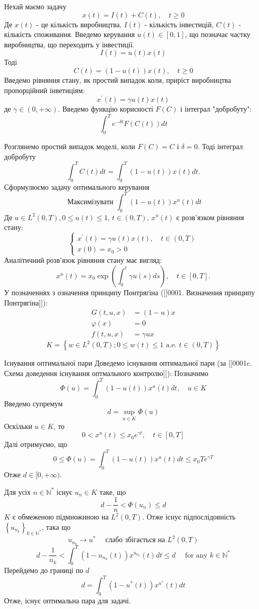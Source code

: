 \documentclass[a4paper,12pt]{extreport}
\begin{document}
Нехай маємо задачу
$$
x(t)=I(t)+C(t), \quad t \geq 0
$$
Де $x(t)$ - це кількість виробництва, $I(t)$ - кількість інвестицій, $C(t)$ - кількість споживання. 
Введемо керування $u(t) \in[0,1]$, що позначає частку виробництва, що переходить у інвестиції.
$$
I(t)=u(t) x(t)
$$
Тоді 
$$
C(t)=(1-u(t)) x(t), \quad t \geq 0
$$
Введемо рівняння стану, як простий випадок коли, приріст виробництва пропорційний інветиціям:
$$
x^{\prime}(t)=\gamma u(t) x(t)
$$
де $\gamma \in(0,+\infty)$.
Введемо функцію корисності $F(C)$ і інтеграл "добробуту":
$$
\int_0^T e^{-\delta t} F(C(t)) d t
$$

Розглянемо простий випадок моделі, коли $F(C)=C \text { і } \delta=0$.
Тоді інтеграл добробуту 
$$
\int_0^T C(t) d t=\int_0^T(1-u(t)) x(t) d t .
$$
Сформулюємо задачу оптимального керування
$$
\text { Максимізувати } \int_0^T(1-u(t)) x^u(t) d t
$$
Де $u \in L^2(0, T), 0 \leq u(t) \leq 1$, $t \in(0, T)$, $x^u(t)$ є розв'язком рівняння стану:
$$
\left\{\begin{array}{l}
x^{\prime}(t)=\gamma u(t) x(t), \quad t \in(0, T) \\
x(0)=x_0>0
\end{array}\right.
$$
Аналітичний розв'язок рівняння стану має вигляд:
$$
x^u(t)=x_0 \exp \left(\int_0^t \gamma u(s) d s\right), \quad t \in[0, T] .
$$
У позначеннях з означення принципу Понтрягіна ([[0001. Визначення принципу Понтрягіна]]):
$$
\begin{aligned}
G(t, u, x) &=(1-u) x \\
\varphi(x) &=0 \\
f(t, u, x) &=\gamma u x
\end{aligned}
$$$$
K=\left\{w \in L^2(0, T) ; 0 \leq w(t) \leq 1 \text { a.e. } t \in(0, T)\right\}
$$

Існування оптимальної пари
Доведемо існування оптимальної пари (за [[0001c. Схема доведення існування оптмального контролю]]):
Позначимо 
$$
\Phi(u)=\int_0^T(1-u(t)) x^u(t) d t, \quad u \in K
$$
Введемо супремум
$$
d=\sup _{u \in K} \Phi(u)
$$
Оскільки $u \in K$, то
$$
0<x^u(t) \leq x_0 e^{\gamma t}, \quad t \in[0, T]
$$
Далі отримуємо, що 
$$
0 \leq \Phi(u)=\int_0^T(1-u(t)) x^u(t) d t \leq x_0 T e^{\gamma T}
$$
Отже $d \in[0,+\infty)$.

Для усіх $n \in \mathbb{N}^*$ існує $u_n \in K$ таке, що 
$$
d-\frac{1}{n}<\Phi\left(u_n\right) \leq d
$$
$K$ є обмеженою підмножиною на $L^2(0, T)$. Отже існує підпослідовність $\left\{u_{n_k}\right\}_{k \in \mathbb{N}^*}$, така що
$$
u_{n_k} \longrightarrow u^* \quad \text { слабо збігається на } L^2(0, T)
$$
$$
d-\frac{1}{n_k}<\int_0^T\left(1-u_{n_k}(t)\right) x^{u_{n_k}}(t) d t \leq d \quad \text { for any } k \in \mathbb{N}^*
$$
Перейдемо до границі по $d$
$$
d=\int_0^T\left(1-u^*(t)\right) x^{u^*}(t) d t
$$Отже, існує оптимальна пара для задачі.
\end{document}
